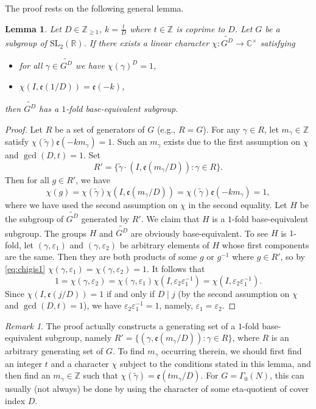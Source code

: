 \documentclass[12pt]{amsart}
\numberwithin{equation}{section}
\theoremstyle{plain}
\newtheorem{lemm}[thm]{Lemma}
\theoremstyle{definition}
\theoremstyle{remark}
\newtheorem{rema}[thm]{Remark}
\newcommand\etp[1]{\mathfrak{e}\left(#1\right)}
\newcommand\numZ{\mathbb{Z}}
\newcommand\numC{\mathbb{C}}
\newcommand\numgeq[2]{\mathbb{#1}_{\geq #2}}
\newcommand\slR{\mathrm{SL}_2(\mathbb{R})}
\newcommand\Dcover[2]{\widetilde{#1^{#2}}}
\begin{document}
\begin{appendix}
The proof rests on the following general lemma.
\begin{lemm}
\label{lemm:condition1foldbe}
Let $D\in\numgeq{Z}{1}$, $k=\frac{t}{D}$ where $t\in\numZ$ is coprime to $D$. Let $G$ be a subgroup of $\slR$. If there exists a linear character $\chi\colon\Dcover{G}{D}\rightarrow\numC^\times$ satisfying
\begin{itemize}
  \item for all $\gamma\in\Dcover{G}{D}$ we have $\chi(\gamma)^D=1$,
  \item $\chi\left(I,\etp{1/D}\right)=\etp{-k}$,
\end{itemize}
then $\Dcover{G}{D}$ has a $1$-fold base-equivalent subgroup.
\end{lemm}
\begin{proof}
Let $R$ be a set of generators of $G$ (e.g., $R=G$). For any $\gamma\in R$, let $m_\gamma\in\numZ$ satisfy $\chi(\widetilde{\gamma})\etp{-km_\gamma}=1$. Such an $m_\gamma$ exists due to the first assumption on $\chi$ and $\gcd(D,t)=1$. Set
\begin{equation*}
R'=\{\widetilde{\gamma}\cdot(I,\etp{m_\gamma/D})\colon\gamma\in R\}.
\end{equation*}
Then for all $g\in R'$, we have
\begin{equation}
\label{eq:chigis1}
\chi(g)=\chi(\widetilde{\gamma})\chi(I,\etp{m_\gamma/D})=\chi(\widetilde{\gamma})\etp{-km_\gamma}=1,
\end{equation}
where we have used the second assumption on $\chi$ in the second equality. Let $H$ be the subgroup of $\Dcover{G}{D}$ generated by $R'$. We claim that $H$ is a $1$-fold base-equivalent subgroup. The groups $H$ and $\Dcover{G}{D}$ are obviously base-equivalent. To see $H$ is $1$-fold, let $(\gamma,\varepsilon_1)$ and $(\gamma,\varepsilon_2)$ be arbitrary elements of $H$ whose first components are the same. Then they are both products of some $g$ or $g^{-1}$ where $g\in R'$, so by \eqref{eq:chigis1} $\chi(\gamma,\varepsilon_1)=\chi(\gamma,\varepsilon_2)=1$. It follows that
\begin{equation*}
1=\chi(\gamma,\varepsilon_2)=\chi(\gamma,\varepsilon_1)\chi(I,\varepsilon_2\varepsilon_1^{-1})=\chi(I,\varepsilon_2\varepsilon_1^{-1}).
\end{equation*}
Since $\chi(I,\etp{j/D})=1$ if and only if $D\mid j$ (by the second assumption on $\chi$ and $\gcd(D,t)=1$), we have $\varepsilon_2\varepsilon_1^{-1}=1$, namely, $\varepsilon_1=\varepsilon_2$.
\end{proof}
\begin{rema}
\label{rema:genset1foldbeSubgroup}
The proof actually constructs a generating set of a $1$-fold base-equivalent subgroup, namely $R'=\{(\gamma,\etp{m_\gamma/D})\colon\gamma\in R\}$, where $R$ is an arbitrary generating set of $G$. To find $m_\gamma$ occurring therein, we should first find an integer $t$ and a character $\chi$ subject to the conditions stated in this lemma, and then find an $m_\gamma\in\numZ$ such that $\chi(\widetilde{\gamma})=\etp{tm_\gamma/D}$. For $G=\Gamma_0(N)$, this can usually (not always) be done by using the character of some eta-quotient of cover index $D$.
\end{rema}


\end{appendix}
\end{document}
